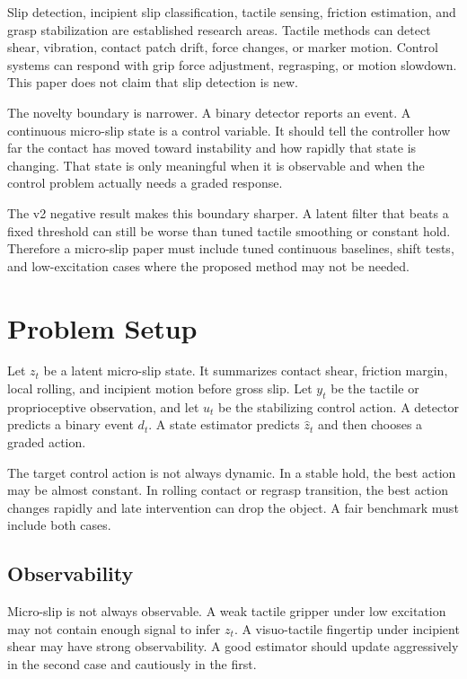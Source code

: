\documentclass{article}
\begin{document}
Slip detection, incipient slip classification, tactile sensing, friction estimation, and grasp stabilization are established research areas. Tactile methods can detect shear, vibration, contact patch drift, force changes, or marker motion. Control systems can respond with grip force adjustment, regrasping, or motion slowdown. This paper does not claim that slip detection is new.

The novelty boundary is narrower. A binary detector reports an event. A continuous micro-slip state is a control variable. It should tell the controller how far the contact has moved toward instability and how rapidly that state is changing. That state is only meaningful when it is observable and when the control problem actually needs a graded response.

The v2 negative result makes this boundary sharper. A latent filter that beats a fixed threshold can still be worse than tuned tactile smoothing or constant hold. Therefore a micro-slip paper must include tuned continuous baselines, shift tests, and low-excitation cases where the proposed method may not be needed.

\section{Problem Setup}

Let $z_t$ be a latent micro-slip state. It summarizes contact shear, friction margin, local rolling, and incipient motion before gross slip. Let $y_t$ be the tactile or proprioceptive observation, and let $u_t$ be the stabilizing control action. A detector predicts a binary event $d_t$. A state estimator predicts $\hat{z}_t$ and then chooses a graded action.

The target control action is not always dynamic. In a stable hold, the best action may be almost constant. In rolling contact or regrasp transition, the best action changes rapidly and late intervention can drop the object. A fair benchmark must include both cases.

\subsection{Observability}

Micro-slip is not always observable. A weak tactile gripper under low excitation may not contain enough signal to infer $z_t$. A visuo-tactile fingertip under incipient shear may have strong observability. A good estimator should update aggressively in the second case and cautiously in the first.
\end{document}
